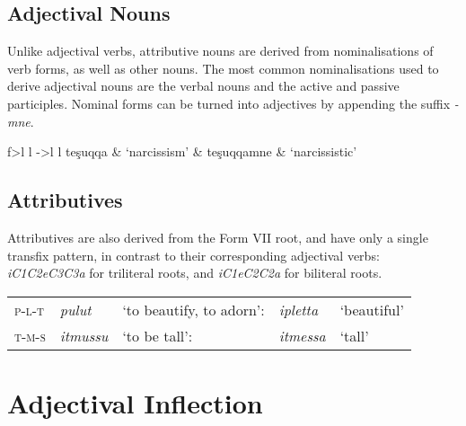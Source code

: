 \documentclass[grammar]{subfiles}
\begin{document}
	\subsection{Adjectival Nouns}
	\label{ssec:am_adjectival_nouns}

	Unlike adjectival verbs, attributive nouns are derived from nominalisations of verb forms, as well as other nouns. The most common nominalisations used to derive adjectival nouns are the verbal nouns and the active and passive participles. Nominal forms can be turned into adjectives by appending the suffix \emph{-mne}.

	\begin{exe}
		\ex\label{exe:am_adjectival_nouns}
		\begin{tabular}[t]{f>{\itshape}l l ->{\itshape}l l}\small
			teşuqqa  & ‘narcissism’ & teşuqqamne  & ‘narcissistic’\\
		\end{tabular}
	\end{exe}

	
	\subsection{Attributives}
	\label{ssec:am_attributives}

	Attributives are also derived from the Form VII root, and have only a single transfix pattern, in contrast to their corresponding adjectival verbs: \emph{iC\sub1C\sub2eC\sub3C\sub3a} for triliteral roots, and \emph{iC\sub1eC\sub2C\sub2a} for biliteral roots.

	\begin{exe}
		\ex\label{exe:am_attributives}
		\begin{tabular}[t]{>{\scshape}l>{\itshape}ll >{\itshape}l l}
			p-l-t & pulut & ‘to beautify, to adorn’: & ipletta & ‘beautiful’ \tabularnewline
			t-m-s & itmussu & ‘to be tall’: & itmessa & ‘tall’ \tabularnewline
			\end{tabular}
	\end{exe}

	\section{Adjectival Inflection}
	\label{sec:am_adjectival_inflection}
\end{document}
